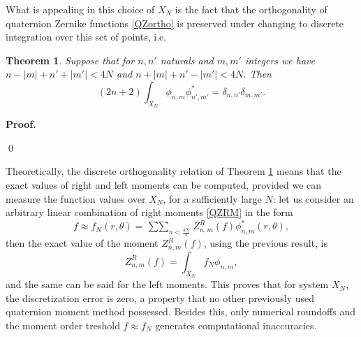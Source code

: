 \documentclass[12pt]{article}
\newtheorem{theorem}{\noindent Theorem}
\begin{document}
What is appealing in this choice of $X_N$ is the fact that the orthogonality of quaternion Zernike functions \eqref{QZortho} is preserved under changing to  discrete integration over this set of points, i.e.
\begin{theorem}\label{QZdisc-ortho}
Suppose that for $n,n'$ naturals and $m,m'$ integers we have $n-|m|+n'+|m'|<4N$ and $n+|m|+n'-|m'|<4N$. Then
\[
	(2n+2) \int_{X_N} \phi_{n,m} \phi^*_{n',m'} =\delta_{n,n'}\delta_{m,m'}.
\]
\end{theorem}
\noindent\textbf{Proof.}

\qed

Theoretically, the discrete orthogonality relation of Theorem \ref{QZdisc-ortho} means that the exact values of right and left moments can be computed, provided we can measure the function values over $X_N$, for a sufficiently large $N$: let us consider an arbitrary linear combination of right moments \eqref{QZRM} in the form
\[
	f \approx f_N(r,\theta) = \mathop{\sum\sum}_{n<\frac{4N}{3}} Z^R_{n,m}(f) \phi^*_{n,m} (r,\theta),
\]
then the exact value of the moment $Z^R_{n,m}(f)$, using the previous result, is
\[
	Z^R_{n,m}(f) = \int_{X_N} f_N\phi_{n,m},
\]
and the same can be said for the left moments. This proves that for system $X_N$, the discretization error is zero, a property that no other previously used quaternion moment method possessed. Besides this, only numerical roundoffs and the moment order treshold $f \approx f_N$ generates computational inaccuracies.
\end{document}
